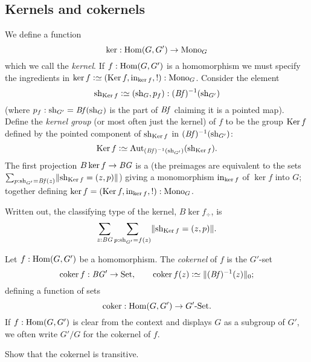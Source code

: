 \subsection{Kernels and cokernels}
\label{sec:kerandcoker}
\begin{definition}
  \label{def:kernel}
 We define a function
  $$\ker:\Hom(G,G')\to\typemono_G$$
  which we call the \emph{kernel}.
 If $f:\Hom(G,G')$  is a homomorphism we must specify the ingredients in  $\ker f\defequi(\Ker f,\incl_{\ker f},!):\typemono_G$.    Consider the element
$$\shape_{\Ker f}\defequi(\shape_G,p_f):(\Bf)^{-1}(\shape_{G'})$$ (where $p_f:\mathrm{sh}_{G'}=\mathit{B}\mathit{f}(\mathrm{sh}_G)$ is the part of $\mathit{B}\mathit{f}$ claiming it is a pointed map).
Define the \emph{kernel group} (or most often just the kernel)
of $f$ to be the group $\Ker f$ defined by the pointed component  of $\shape_{\Ker f}$ in $(\mathit{B}\mathit{f})^{-1}(\mathrm{sh}_{G'})$:
$$\Ker f\defequi \aut_{(\Bf)^{-1}(\shape_{G'})}(\shape_{\Ker f}).
$$
The first projection $B\ker f\to \BG$ is a \covering (the preimages are equivalent to the sets $\sum_{p:\shape_{G'}=\Bf(z)}\Trunc{\shape_{\Ker f}=(z,p)}$) giving a monomorphism
$\incl_{\ker f}$ of $\ker f$ into $G$; together defining $\ker f=(\Ker f,\incl_{\ker f},!):\typemono_G$.
\end{definition}

Written out, the classifying type of the kernel,
$B\ker f_\div$, is $$\sum_{z:\BG}\sum_{p:\shape_{G'}=f(z)}\Trunc{\shape_{\Ker f}=(z,p)}.$$

\begin{definition}
  \label{def:cokernel}
  Let $f:\Hom(G,G')$  be a homomorphism.
The \emph{cokernel} of $f$ is the $G'$-set
\[
  \coker f:\BG'\to\Set,\qquad \coker f(z)\defequi  \Trunc{(\Bf)^{-1}(z)}_0;
\]
defining a function of sets
$$\coker:\Hom(G,G')\to G'\text{-}\Set.$$
If $f:\Hom(G,G')$ is clear from the context and displays $G$ as a subgroup of $G'$, we often write $G'/G$ for the cokernel of $f$.
\end{definition}
\begin{xca}
  Show that the cokernel is transitive.
\end{xca}

